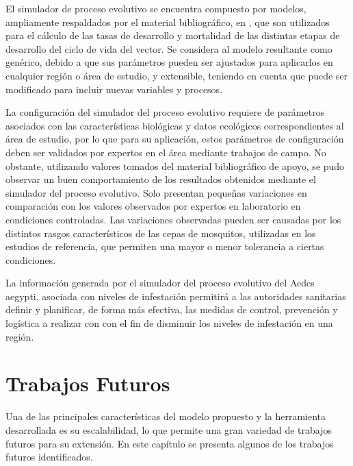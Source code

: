 El simulador de proceso evolutivo se encuentra compuesto por modelos, ampliamente respaldados por
el material bibliográfico, en \cite{sharpe1977reaction, focks1993dynamic, schoolfield1981non, otero2006stochastic, rueda1990temperature}, que son utilizados para el cálculo de las tasas de
desarrollo y mortalidad de las distintas etapas de desarrollo del ciclo de vida del vector. Se
considera al modelo resultante como genérico, debido a que sus parámetros pueden ser
ajustados para aplicarlos en cualquier región o área de estudio, y extensible, teniendo en cuenta que puede ser modificado para incluir nuevas variables y procesos.

La configuración del simulador del proceso evolutivo requiere de parámetros asociados con las
características biológicas y datos ecológicos correspondientes al área de estudio, por lo que para
su aplicación, estos parámetros de configuración deben ser validados por expertos en el área
mediante trabajos de campo. No obstante, utilizando valores tomados del material bibliográfico de
apoyo, se pudo observar un buen comportamiento de los resultados obtenidos mediante el simulador
del proceso evolutivo. Solo presentan pequeñas variaciones en comparación con los valores
observados por expertos en laboratorio en condiciones controladas. Las variaciones observadas
pueden ser causadas por los distintos rasgos característicos de las cepas de mosquitos, utilizadas
en los estudios de referencia, que permiten una mayor o menor tolerancia a ciertas condiciones.

La información generada por el simulador del proceso evolutivo del Aedes aegypti, asociada con
niveles de infestación permitirá a las autoridades sanitarias definir y planificar, de forma más
efectiva, las medidas de control, prevención y logística a realizar con con el fin de disminuir
los niveles de infestación en una región.

\chapter{Trabajos Futuros}
Una de las principales características del modelo propuesto y la herramienta desarrollada es su
escalabilidad, lo que permite una gran variedad de trabajos futuros para su extensión. En este capítulo se presenta algunos de los trabajos futuros identificados.

